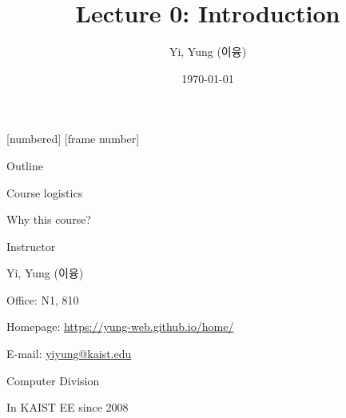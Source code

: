 
\csname\pdfmode\endcsname

{
  [numbered]
  [frame number]  %
} 



\title[]{Lecture 0: Introduction}
\author{Yi, Yung (이융)}
\date{\today}








\begin{frame}
  \titlepage
\end{frame}


\begin{frame}{Outline}

\bci
\item Course logistics

\item Why this course? 
\eci
\end{frame}


\begin{frame}{Instructor}

\bci
\item Yi, Yung (이융)
\item Office: N1, 810
\item Homepage: \url{https://yung-web.github.io/home/}
\item E-mail: \url{yiyung@kaist.edu}
\item Computer Division
\item In KAIST EE since 2008


\eci

\end{frame}

